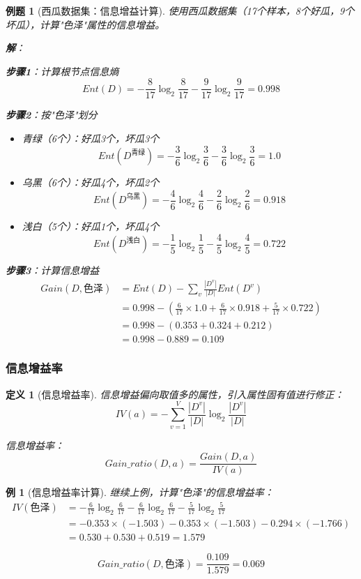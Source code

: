 \documentclass[12pt,a4paper]{ctexart}
\newtheorem{definition}{定义}[section]
\newtheorem{example}{例}[section]
\newtheorem{exercise}{例题}[section]
\begin{document}
\begin{exercise}[西瓜数据集：信息增益计算]
使用西瓜数据集（17个样本，8个好瓜，9个坏瓜），计算"色泽"属性的信息增益。

\textbf{解}：

\textbf{步骤1}：计算根节点信息熵
\[
Ent(D) = -\frac{8}{17}\log_2\frac{8}{17} - \frac{9}{17}\log_2\frac{9}{17} = 0.998
\]

\textbf{步骤2}：按"色泽"划分
\begin{itemize}
    \item 青绿（6个）：好瓜3个，坏瓜3个
    \[
    Ent(D^{\text{青绿}}) = -\frac{3}{6}\log_2\frac{3}{6} - \frac{3}{6}\log_2\frac{3}{6} = 1.0
    \]
    
    \item 乌黑（6个）：好瓜4个，坏瓜2个
    \[
    Ent(D^{\text{乌黑}}) = -\frac{4}{6}\log_2\frac{4}{6} - \frac{2}{6}\log_2\frac{2}{6} = 0.918
    \]
    
    \item 浅白（5个）：好瓜1个，坏瓜4个
    \[
    Ent(D^{\text{浅白}}) = -\frac{1}{5}\log_2\frac{1}{5} - \frac{4}{5}\log_2\frac{4}{5} = 0.722
    \]
\end{itemize}

\textbf{步骤3}：计算信息增益
\begin{align*}
Gain(D, \text{色泽}) &= Ent(D) - \sum_{v} \frac{|D^v|}{|D|} Ent(D^v) \\
&= 0.998 - \left(\frac{6}{17} \times 1.0 + \frac{6}{17} \times 0.918 + \frac{5}{17} \times 0.722\right) \\
&= 0.998 - (0.353 + 0.324 + 0.212) \\
&= 0.998 - 0.889 = \boxed{0.109}
\end{align*}
\end{exercise}

\subsubsection{信息增益率}

\begin{definition}[信息增益率]
信息增益偏向取值多的属性，引入属性固有值进行修正：
\[
IV(a) = -\sum_{v=1}^{V} \frac{|D^v|}{|D|} \log_2 \frac{|D^v|}{|D|}
\]

信息增益率：
\[
Gain\_ratio(D, a) = \frac{Gain(D, a)}{IV(a)}
\]
\end{definition}

\begin{example}[信息增益率计算]
继续上例，计算"色泽"的信息增益率：
\begin{align*}
IV(\text{色泽}) &= -\frac{6}{17}\log_2\frac{6}{17} - \frac{6}{17}\log_2\frac{6}{17} - \frac{5}{17}\log_2\frac{5}{17} \\
&= -0.353 \times (-1.503) - 0.353 \times (-1.503) - 0.294 \times (-1.766) \\
&= 0.530 + 0.530 + 0.519 = 1.579
\end{align*}

\[
Gain\_ratio(D, \text{色泽}) = \frac{0.109}{1.579} = 0.069
\]
\end{example}
\end{document}
